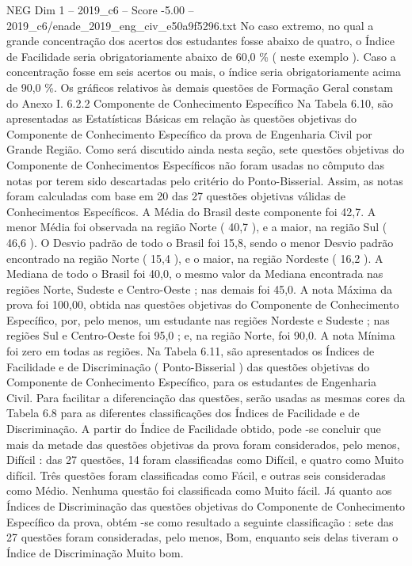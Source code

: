 \begin{textsample}{NEG Dim 1 – 2019\_c6 – Score -5.00 – 2019\_c6/enade\_2019\_eng\_civ\_e50a9f5296.txt}
No caso extremo, no qual a grande concentração dos acertos dos estudantes fosse abaixo de quatro, o Índice de Facilidade seria obrigatoriamente abaixo de 60,0 \% ( neste exemplo ).
Caso a concentração fosse em seis acertos ou mais, o índice seria obrigatoriamente acima de 90,0 \%.
Os gráficos relativos às demais questões de Formação Geral constam do Anexo I. 6.2.2 Componente de Conhecimento Específico Na Tabela 6.10, são apresentadas as Estatísticas Básicas em relação às questões objetivas do Componente de Conhecimento Específico da prova de Engenharia Civil por Grande Região.
Como será discutido ainda nesta seção, sete questões objetivas do Componente de Conhecimentos Específicos não foram usadas no cômputo das notas por terem sido descartadas pelo critério do Ponto-Bisserial.
Assim, as notas foram calculadas com base em 20 das 27 questões objetivas válidas de Conhecimentos Específicos.
A Média do Brasil deste componente foi 42,7.
A menor Média foi observada na região Norte ( 40,7 ), e a maior, na região Sul ( 46,6 ).
O Desvio padrão de todo o Brasil foi 15,8, sendo o menor Desvio padrão encontrado na região Norte ( 15,4 ), e o maior, na região Nordeste ( 16,2 ).
A Mediana de todo o Brasil foi 40,0, o mesmo valor da Mediana encontrada nas regiões Norte, Sudeste e Centro-Oeste ; nas demais foi 45,0.
A nota Máxima da prova foi 100,00, obtida nas questões objetivas do Componente de Conhecimento Específico, por, pelo menos, um estudante nas regiões Nordeste e Sudeste ; nas regiões Sul e Centro-Oeste foi 95,0 ; e, na região Norte, foi 90,0.
A nota Mínima foi zero em todas as regiões.
Na Tabela 6.11, são apresentados os Índices de Facilidade e de Discriminação ( Ponto-Bisserial ) das questões objetivas do Componente de Conhecimento Específico, para os estudantes de Engenharia Civil.
Para facilitar a diferenciação das questões, serão usadas as mesmas cores da Tabela 6.8 para as diferentes classificações dos Índices de Facilidade e de Discriminação.
A partir do Índice de Facilidade obtido, pode -se concluir que mais da metade das questões objetivas da prova foram considerados, pelo menos, Difícil : das 27 questões, 14 foram classificadas como Difícil, e quatro como Muito difícil.
Três questões foram classificadas como Fácil, e outras seis consideradas como Médio.
Nenhuma questão foi classificada como Muito fácil.
Já quanto aos Índices de Discriminação das questões objetivas do Componente de Conhecimento Específico da prova, obtém -se como resultado a seguinte classificação : sete das 27 questões foram consideradas, pelo menos, Bom, enquanto seis delas tiveram o Índice de Discriminação Muito bom.

\end{textsample}

